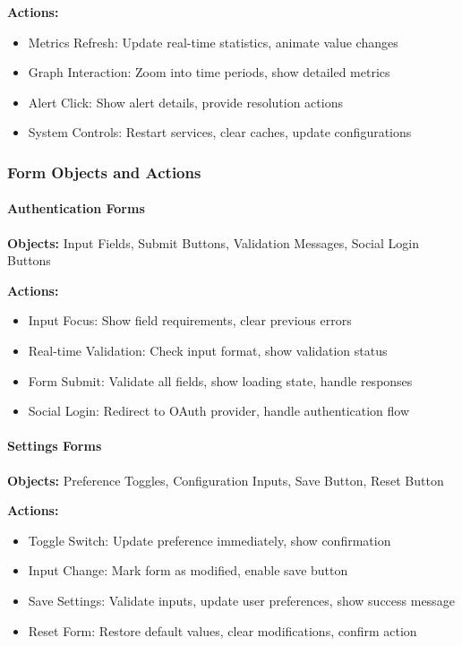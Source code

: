 \documentclass[12pt,a4paper]{article}
\begin{document}
    \textbf{Actions:}
    \begin{itemize}[leftmargin=0.5in]
        \item Metrics Refresh: Update real-time statistics, animate value changes
        \item Graph Interaction: Zoom into time periods, show detailed metrics
        \item Alert Click: Show alert details, provide resolution actions
        \item System Controls: Restart services, clear caches, update configurations
    \end{itemize}

    \subsubsection{Form Objects and Actions}

    \paragraph{Authentication Forms}
    \textbf{Objects:} Input Fields, Submit Buttons, Validation Messages, Social Login Buttons

    \textbf{Actions:}
    \begin{itemize}[leftmargin=0.5in]
        \item Input Focus: Show field requirements, clear previous errors
        \item Real-time Validation: Check input format, show validation status
        \item Form Submit: Validate all fields, show loading state, handle responses
        \item Social Login: Redirect to OAuth provider, handle authentication flow
    \end{itemize}

    \paragraph{Settings Forms}
    \textbf{Objects:} Preference Toggles, Configuration Inputs, Save Button, Reset Button

    \textbf{Actions:}
    \begin{itemize}[leftmargin=0.5in]
        \item Toggle Switch: Update preference immediately, show confirmation
        \item Input Change: Mark form as modified, enable save button
        \item Save Settings: Validate inputs, update user preferences, show success message
        \item Reset Form: Restore default values, clear modifications, confirm action
    \end{itemize}
\end{document}
